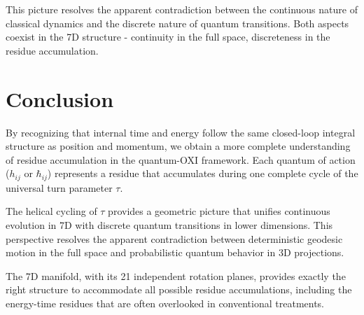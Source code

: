 \documentclass{article}
\begin{document}
This picture resolves the apparent contradiction between the continuous nature of classical dynamics and the discrete nature of quantum transitions. Both aspects coexist in the 7D structure - continuity in the full space, discreteness in the residue accumulation.

\section{Conclusion}

By recognizing that internal time and energy follow the same closed-loop integral structure as position and momentum, we obtain a more complete understanding of residue accumulation in the quantum-OXI framework. Each quantum of action ($h_{ij}$ or $\hbar_{ij}$) represents a residue that accumulates during one complete cycle of the universal turn parameter $\tau$.

The helical cycling of $\tau$ provides a geometric picture that unifies continuous evolution in 7D with discrete quantum transitions in lower dimensions. This perspective resolves the apparent contradiction between deterministic geodesic motion in the full space and probabilistic quantum behavior in 3D projections.

The 7D manifold, with its 21 independent rotation planes, provides exactly the right structure to accommodate all possible residue accumulations, including the energy-time residues that are often overlooked in conventional treatments.
\end{document}
